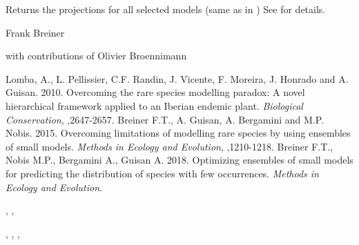 \documentclass[a4paper]{book}
\begin{document}
%
\begin{Value}
Returns the projections for all selected models (same as in )
See  for details.

\end{Value}
%
\begin{Author}\relax
 Frank Breiner  

with contributions of Olivier Broennimann 
\end{Author}
%
\begin{References}\relax

Lomba, A., L. Pellissier, C.F. Randin, J. Vicente, F. Moreira, J. Honrado and A. Guisan. 2010. Overcoming the rare species modelling paradox: A novel hierarchical framework applied to an Iberian endemic plant. \emph{Biological Conservation}, ,2647-2657.
Breiner F.T., A. Guisan, A. Bergamini and M.P. Nobis. 2015. Overcoming limitations of modelling rare species by using ensembles of small models. \emph{Methods in Ecology and Evolution}, ,1210-1218.
Breiner F.T., Nobis M.P., Bergamini A., Guisan A. 2018. Optimizing ensembles of small models for predicting the distribution of species with few occurrences. \emph{Methods in Ecology and Evolution}. 

\end{References}
%
\begin{SeeAlso}\relax
{}, , 

, , ,

\end{SeeAlso}
%
\end{document}
